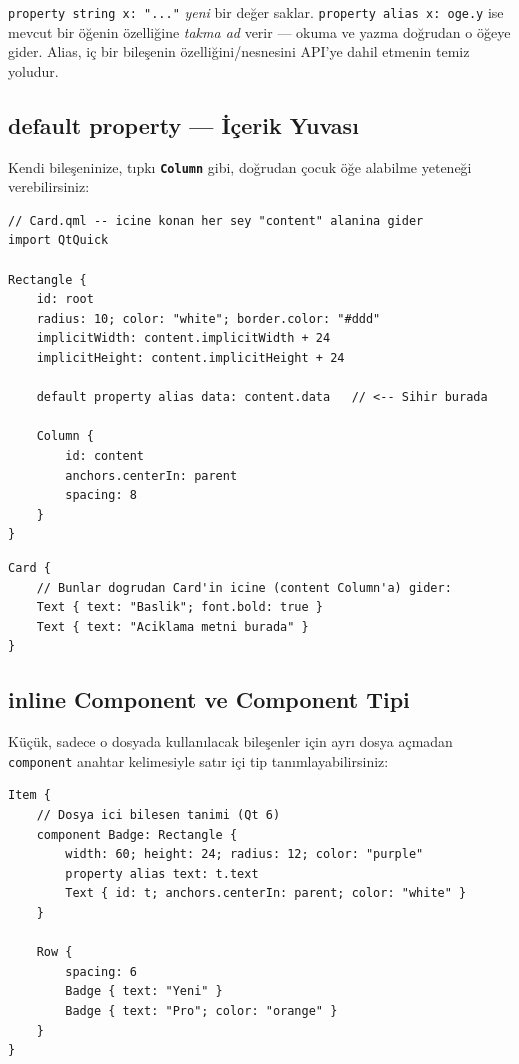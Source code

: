 \documentclass[11pt,a4paper]{article}
\newcommand{\kls}[1]{\texttt{\color{anaMavi}\textbf{#1}}}
\newcommand{\kod}[1]{\texttt{\color{koyuGri}#1}}
\begin{document}
\begin{notkutu}
\kod{property string x: "..."} \emph{yeni} bir değer saklar. \kod{property alias x:
oge.y} ise mevcut bir öğenin özelliğine \emph{takma ad} verir — okuma ve yazma
doğrudan o öğeye gider. Alias, iç bir bileşenin özelliğini/nesnesini API'ye dahil
etmenin temiz yoludur.
\end{notkutu}

\subsection{default property — İçerik Yuvası}

Kendi bileşeninize, tıpkı \kls{Column} gibi, doğrudan çocuk öğe alabilme
yeteneği verebilirsiniz:

\begin{lstlisting}
// Card.qml -- icine konan her sey "content" alanina gider
import QtQuick

Rectangle {
    id: root
    radius: 10; color: "white"; border.color: "#ddd"
    implicitWidth: content.implicitWidth + 24
    implicitHeight: content.implicitHeight + 24

    default property alias data: content.data   // <-- Sihir burada

    Column {
        id: content
        anchors.centerIn: parent
        spacing: 8
    }
}
\end{lstlisting}

\begin{lstlisting}
Card {
    // Bunlar dogrudan Card'in icine (content Column'a) gider:
    Text { text: "Baslik"; font.bold: true }
    Text { text: "Aciklama metni burada" }
}
\end{lstlisting}

\subsection{inline Component ve Component Tipi}

Küçük, sadece o dosyada kullanılacak bileşenler için ayrı dosya açmadan
\kod{component} anahtar kelimesiyle satır içi tip tanımlayabilirsiniz:

\begin{lstlisting}
Item {
    // Dosya ici bilesen tanimi (Qt 6)
    component Badge: Rectangle {
        width: 60; height: 24; radius: 12; color: "purple"
        property alias text: t.text
        Text { id: t; anchors.centerIn: parent; color: "white" }
    }

    Row {
        spacing: 6
        Badge { text: "Yeni" }
        Badge { text: "Pro"; color: "orange" }
    }
}
\end{lstlisting}
\end{document}

